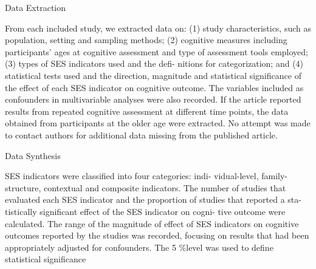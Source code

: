 \documentclass[english,man]{apa6}
\newcounter{author}
\theoremstyle{definition}
\theoremstyle{definition}
\theoremstyle{definition}
\theoremstyle{remark}
\begin{document}
Data Extraction

From each included study, we extracted data on: (1) study
characteristics, such as population, setting and sampling methods; (2)
cognitive measures including participants' ages at cognitive assessment
and type of assessment tools employed; (3) types of SES indicators used
and the defi- nitions for categorization; and (4) statistical tests used
and the direction, magnitude and statistical significance of the effect
of each SES indicator on cognitive outcome. The variables included as
confounders in multivariable analyses were also recorded. If the article
reported results from repeated cognitive assessment at different time
points, the data obtained from participants at the older age were
extracted. No attempt was made to contact authors for additional data
missing from the published article.

Data Synthesis

SES indicators were classified into four categories: indi- vidual-level,
family-structure, contextual and composite indicators. The number of
studies that evaluated each SES indicator and the proportion of studies
that reported a sta- tistically significant effect of the SES indicator
on cogni- tive outcome were calculated. The range of the magnitude of
effect of SES indicators on cognitive outcomes reported by the studies
was recorded, focusing on results that had been appropriately adjusted
for confounders. The 5 \%level was used to define statistical
significance
\end{document}
